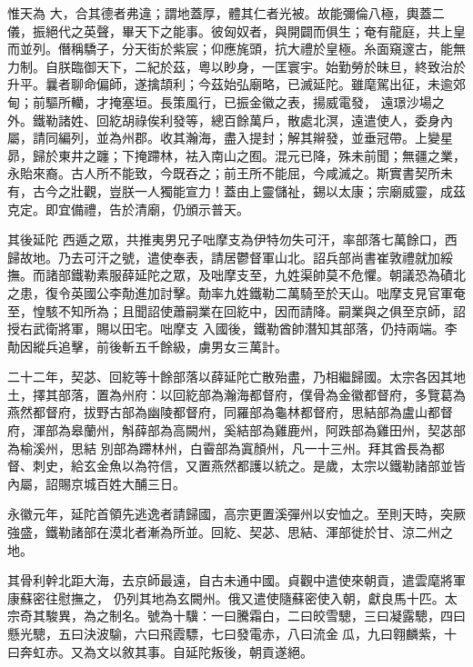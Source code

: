 \begin{pinyinscope}
 惟天為
 大，合其德者弗違；謂地蓋厚，體其仁者光被。故能彌倫八極，輿蓋二儀，振絕代之英聲，畢天下之能事。彼匈奴者，與開闢而俱生；奄有龍庭，共上皇而並列。僭稱驕子，分天街於紫宸；仰應旄頭，抗大禮於皇極。糸面窺邃古，能無力制。自朕臨御天下，二紀於茲，粵以眇身，一匡寰宇。始勤勞於昧旦，終致治於升平。曩者聊命偏師，遂擒頡利；今茲始弘廟略，已滅延陀。雖麾駕出征，未逾郊甸；前驅所轥，才掩塞垣。長策風行，已振金徽之表，揚威電發，
 遠璟沙場之外。鐵勒諸姓、回紇胡祿俟利發等，總百餘萬戶，散處北溟，遠遣使人，委身內屬，請同編列，並為州郡。收其瀚海，盡入提封；解其辮發，並垂冠帶。上變星昴，歸於東井之躔；下掩蹛林，袪入南山之囿。混元已降，殊未前聞；無疆之業，永貽來裔。古人所不能致，今既吞之；前王所不能屈，今咸滅之。斯實書契所未有，古今之壯觀，豈朕一人獨能宣力！蓋由上靈儲祉，錫以太康；宗廟威靈，成茲克定。即宜備禮，告於清廟，仍頒示普天。



 其後延陀
 西遁之眾，共推夷男兄子咄摩支為伊特勿失可汗，率部落七萬餘口，西歸故地。乃去可汗之號，遣使奉表，請居鬱督軍山北。詔兵部尚書崔敦禮就加綏撫。而諸部鐵勒素服薛延陀之眾，及咄摩支至，九姓渠帥莫不危懼。朝議恐為磧北之患，復令英國公李勣進加討擊。勣率九姓鐵勒二萬騎至於天山。咄摩支見官軍奄至，惶駭不知所為；且聞詔使蕭嗣業在回紇中，因而請降。嗣業與之俱至京師，詔授右武衛將軍，賜以田宅。咄摩支
 入國後，鐵勒酋帥潛知其部落，仍持兩端。李勣因縱兵追擊，前後斬五千餘級，虜男女三萬計。



 二十二年，契苾、回紇等十餘部落以薛延陀亡散殆盡，乃相繼歸國。太宗各因其地土，擇其部落，置為州府：以回紇部為瀚海都督府，僕骨為金徽都督府，多覽葛為燕然都督府，拔野古部為幽陵都督府，同羅部為龜林都督府，思結部為盧山都督府，渾部為皋蘭州，斛薛部為高闕州，奚結部為雞鹿州，阿跌部為雞田州，契苾部為榆溪州，思結
 別部為蹛林州，白霫部為寘顏州，凡一十三州。拜其酋長為都督、刺史，給玄金魚以為符信，又置燕然都護以統之。是歲，太宗以鐵勒諸部並皆內屬，詔賜京城百姓大酺三日。



 永徽元年，延陀首領先逃逸者請歸國，高宗更置溪彈州以安恤之。至則天時，突厥強盛，鐵勒諸部在漠北者漸為所並。回紇、契苾、思結、渾部徙於甘、涼二州之地。



 其骨利幹北距大海，去京師最遠，自古未通中國。貞觀中遣使來朝貢，遣雲麾將軍康蘇密往慰撫之，
 仍列其地為玄闕州。俄又遣使隨蘇密使入朝，獻良馬十匹。太宗奇其駿異，為之制名。號為十驥：一曰騰霜白，二曰皎雪驄，三曰凝露驄，四曰懸光驄，五曰決波騟，六曰飛霞驃，七曰發電赤，八曰流金瓜，九曰翱麟紫，十曰奔虹赤。又為文以敘其事。自延陀叛後，朝貢遂絕。




\end{pinyinscope}
